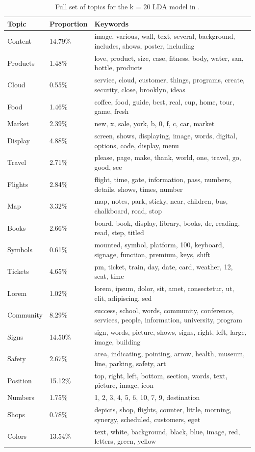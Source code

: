 \begin{table}[h]
\centering
\caption{Full set of topics for the k = 20 LDA model in \DatasetName.}
\begin{tabular}{|l|l|p{10cm}|}
\hline
\textbf{Topic} & \textbf{Proportion} & \textbf{Keywords} \\ \hline
Content & 14.79\% & image, various, wall, text, several, background, includes, shows, poster, including \\ \hline
Products & 1.48\% & love, product, size, case, fitness, body, water, san, bottle, products \\ \hline
Cloud & 0.55\% & service, cloud, customer, things, programs, create, security, close, brooklyn, ideas \\ \hline
Food & 1.46\% & coffee, food, guide, best, real, cup, home, tour, game, fresh \\ \hline
Market & 2.39\% & new, x, sale, york, b, 0, f, c, car, market \\ \hline
Display & 4.88\% & screen, shows, displaying, image, words, digital, options, code, display, menu \\ \hline
Travel & 2.71\% & please, page, make, thank, world, one, travel, go, good, see \\ \hline
Flights & 2.84\% & flight, time, gate, information, pass, numbers, details, shows, times, number \\ \hline
Map & 3.32\% & map, notes, park, sticky, near, children, bus, chalkboard, road, stop \\ \hline
Books & 2.66\% & board, book, display, library, books, de, reading, read, step, titled \\ \hline
Symbols & 0.61\% & mounted, symbol, platform, 100, keyboard, signage, function, premium, keys, shift \\ \hline
Tickets & 4.65\% & pm, ticket, train, day, date, card, weather, 12, seat, time \\ \hline
Lorem & 1.02\% & lorem, ipsum, dolor, sit, amet, consectetur, ut, elit, adipiscing, sed \\ \hline
Community & 8.29\% & success, school, words, community, conference, services, people, information, university, program \\ \hline
Signs & 14.50\% & sign, words, picture, shows, signs, right, left, large, image, building \\ \hline
Safety & 2.67\% & area, indicating, pointing, arrow, health, museum, line, parking, safety, art \\ \hline
Position & 15.12\% & top, right, left, bottom, section, words, text, picture, image, icon \\ \hline
Numbers & 1.75\% & 1, 2, 3, 4, 5, 6, 10, 7, 9, destination \\ \hline
Shops & 0.78\% & depicts, shop, flights, counter, little, morning, synergy, scheduled, customers, eget \\ \hline
Colors & 13.54\% & text, white, background, black, blue, image, red, letters, green, yellow \\ \hline
\end{tabular}
\label{tab:lda_topics_full}
\end{table}